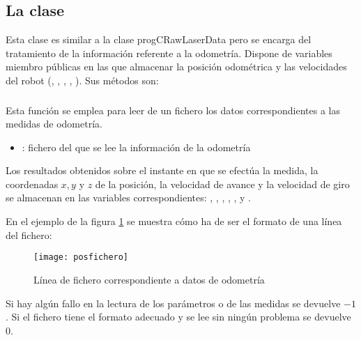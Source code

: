 \subsection{La clase } \label{CPosData}

Esta clase es similar a la clase prog{CRawLaserData} pero se encarga del tratamiento de la información referente a la odometría. Dispone de variables miembro públicas en las que almacenar la posición odométrica y las velocidades del robot (, , , , ). Sus métodos son:

\subsubsection{}

\noindent
{}

\noindent
Esta función se emplea para leer de un fichero los datos correspondientes a las medidas de odometría.

\begin{itemize}
  \item {}: fichero del que se lee la información de la odometría
\end{itemize}

\noindent
Los resultados obtenidos sobre el instante en que se efectúa la medida, la coordenadas $x, y$ y $z$ de la posición, la velocidad de avance y la velocidad de giro se almacenan en las variables correspondientes: , , , , ,  y .

En el ejemplo de la figura \ref{fg:ficheropos} se muestra cómo ha de ser el formato de una línea del fichero:

\begin{figure}[h]
  \centering\texttt{[image: posfichero]}\\
  \caption{Línea de fichero correspondiente a datos de odometría}\label{fg:ficheropos}
\end{figure}

\noindent
Si hay algún fallo en la lectura de los parámetros o de las medidas se devuelve $-1$. Si el fichero tiene el formato adecuado y se lee sin ningún problema se devuelve $0$.

\subsubsection{}

